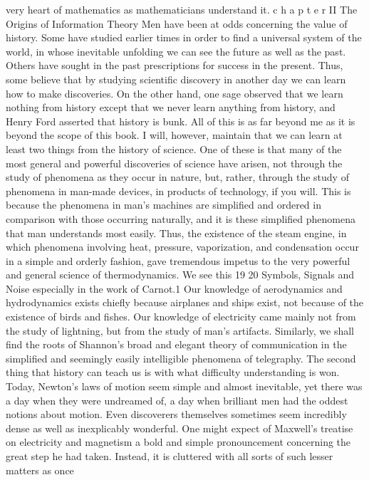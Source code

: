 very heart of mathematics as mathematicians understand it.
c h a p t e r II The Origins of
Information Theory
Men have been at odds concerning the value of history. Some
have studied earlier times in order to find a universal system of
the world, in whose inevitable unfolding we can see the future as
well as the past. Others have sought in the past prescriptions for
success in the present. Thus, some believe that by studying scientific
discovery in another day we can learn how to make discoveries.
On the other hand, one sage observed that we learn nothing from
history except that we never learn anything from history, and
Henry Ford asserted that history is bunk.
All of this is as far beyond me as it is beyond the scope of this
book. I will, however, maintain that we can learn at least two
things from the history of science.
One of these is that many of the most general and powerful
discoveries of science have arisen, not through the study of phenomena
as they occur in nature, but, rather, through the study of
phenomena in man-made devices, in products of technology, if you
will. This is because the phenomena in man’s machines are simplified
and ordered in comparison with those occurring naturally, and
it is these simplified phenomena that man understands most easily.
Thus, the existence of the steam engine, in which phenomena
involving heat, pressure, vaporization, and condensation occur in a
simple and orderly fashion, gave tremendous impetus to the very
powerful and general science of thermodynamics. We see this
19
20
Symbols, Signals and Noise
especially in the work of Carnot.1 Our knowledge of aerodynamics
and hydrodynamics exists chiefly because airplanes and ships
exist, not because of the existence of birds and fishes. Our knowledge
of electricity came mainly not from the study of lightning,
but from the study of man’s artifacts.
Similarly, we shall find the roots of Shannon’s broad and elegant
theory of communication in the simplified and seemingly
easily intelligible phenomena of telegraphy.
The second thing that history can teach us is with what difficulty
understanding is won. Today, Newton’s laws of motion seem
simple and almost inevitable, yet there was a day when they were
undreamed of, a day when brilliant men had the oddest notions
about motion. Even discoverers themselves sometimes seem incredibly
dense as well as inexplicably wonderful. One might expect
of Maxwell’s treatise on electricity and magnetism a bold and
simple pronouncement concerning the great step he had taken.
Instead, it is cluttered with all sorts of such lesser matters as once
